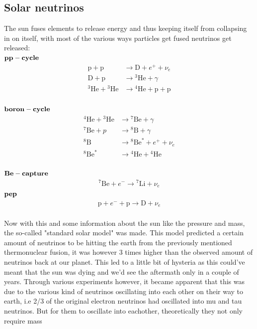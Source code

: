 \documentclass[11pt,a4paper,faculty=we,language=en,doctype=report]{cls/ugent-doc}
\begin{document}
\subsection{Solar neutrinos}
The sun fuses elements to release energy and thus keeping itself from collapsing in 
on itself, with most of the various ways particles get fused neutrinos get released:\\
$\bold{pp-cycle}$
\begin{align}
	\mathrm{p} + \mathrm{p} &\rightarrow \mathrm{D} + e^+ + \nu_e\\
	\mathrm{D} + \mathrm{p} &\rightarrow {}^3\mathrm{He} + \gamma\\
	{}^3\mathrm{He} + {}^3\mathrm{He} &\rightarrow {}^4\mathrm{He} + \mathrm{p} + \mathrm{p}
\end{align}\\
$\bold{boron-cycle}$
\begin{align}
{ }^4 \mathrm{He}+{ }^3 \mathrm{He} & \rightarrow{ }^7 \mathrm{Be}+\gamma \\
{ }^7 \mathrm{Be}+p & \rightarrow { }^8\mathrm{B} + \gamma \\
{ }^8 \mathrm{B} & \rightarrow{ }^8 \mathrm{Be}^*+e^{+}+\nu_e \\
{ }^8 \mathrm{Be}^* & \rightarrow{ }^4 \mathrm{He}+{ }^4 \mathrm{He}
\end{align}\\
$\bold{Be-capture}$
\begin{align}
	^7\mathrm{Be} + e^- \rightarrow {}^7\mathrm{Li} + \nu_e
\end{align}
$\bold{pep}$
\begin{align}
	\mathrm{p} + e^- + \mathrm{p} \rightarrow \mathrm{D} + \nu_e
\end{align}\\
Now with this and some information about the sun like the pressure and mass,
the so-called "standard solar model" was made. This model predicted a certain
amount of neutrinos to be hitting the earth from the previously mentioned
thermonuclear fusion, it was however 3 times higher than the observed amount of
neutrinos back at our planet. This led to a little bit of hysteria as this could've meant
that the sun was dying and we'd see the aftermath only in a couple of years.
Through various experiments however, it became apparent
that this was due to the various kind of neutrinos oscillating into each other
on their way to earth,
i.e 2/3 of the original electron neutrinos had oscillated into mu and tau
neutrinos. But for them to oscillate into eachother, theoretically they not only require mass
\end{document}
